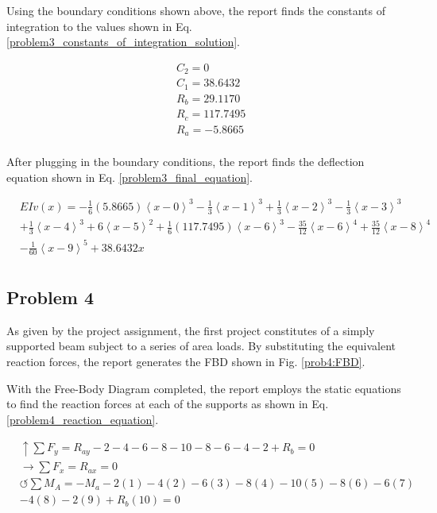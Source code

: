 \documentclass[a4paper]{article}
\begin{document}
Using the boundary conditions shown above, the report finds the constants of integration to the values shown in Eq. \ref{problem3_constants_of_integration_solution}.

\begin{equation}
\begin{split}
	& C_2 = 0 \\
	& C_1 = 38.6432 \\
	& R_b = 29.1170 \\
	& R_c = 117.7495\\
	& R_a = -5.8665 \\
\end{split}
\label{problem3_constants_of_integration_solution}
\end{equation}

After plugging in the boundary conditions, the report finds the deflection equation shown in Eq. \ref{problem3_final_equation}.

\begin{equation}
\begin{split}
  & EI v(x) = -\frac{1}{6}\left(5.8665\right)\left<x-0\right>^3 - \frac{1}{3}\left<x-1\right>^3 +  \frac{1}{3}\left<x-2\right>^3 - \frac{1}{3}\left<x-3\right>^3 \\
& +  \frac{1}{3}\left<x-4\right>^3 + 6\left<x-5\right>^2 + \frac{1}{6}\left(117.7495\right)\left<x-6\right>^3 -  \frac{35}{12}\left<x-6\right>^4 + \frac{35}{12}\left<x-8\right>^4  \\
& - \frac{1}{60}\left<x-9\right>^5 + 38.6432x \\
\end{split}
\label{problem3_final_equation}
\end{equation}





\subsection{Problem 4}

As given by the project assignment, the first project constitutes of a simply supported beam subject to a series of area loads. By substituting the equivalent reaction forces, the report generates the FBD shown in Fig. \ref{prob4:FBD}.

With the Free-Body Diagram completed, the report employs the static equations to find the reaction forces at each of the supports as shown in Eq. \ref{problem4_reaction_equation}.

\begin{equation}
\begin{split}
	&\uparrow \sum F_y = R_{ay} -2 -4 -6 -8 -10 -8 -6 -4 -2 + R_b= 0 \\
 	&\rightarrow \sum F_x = R_{ax} = 0 \\
 	&\circlearrowleft \sum M_A = -M_a -2(1) -4(2) -6(3) -8(4) -10(5) -8(6) -6(7) \\
	& - 4(8) -2(9) + R_b(10) = 0 \\
\end{split}
\label{problem4_reaction_equation}
\end{equation}
\end{document}
